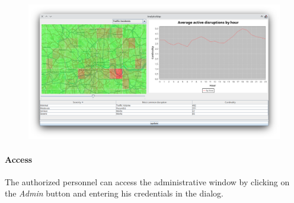 \begin{figure}[H]
	\centering
	\includegraphics[width=\linewidth]{assets/anayitics0.png}
	\caption[]{}
	\label{fig:anal0}
\end{figure}

\paragraph{Access}
The authorized personnel can access the administrative window by clicking on 
the \textit{Admin} button and entering his credentials in the dialog.

